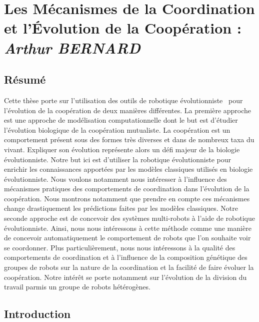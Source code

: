 \chapter*{Les Mécanismes de la Coordination et l'Évolution de la Coopération : \newline \textit{\large Arthur BERNARD}}

\setcounter{chapter}{1}

\minitoc[n] %

\setcounter{page}{1}

\section{Résumé}

	Cette thèse porte sur l'utilisation des outils de robotique évolutionniste~\parencite{Nolfi2000, Doncieux2015a} pour l'évolution de la coopération de deux manières différentes. La première approche est une approche de modélisation computationnelle dont le but est d'étudier l'évolution biologique de la coopération mutualiste. La coopération est un comportement présent sous des formes très diverses et dans de nombreux taxa du vivant. Expliquer son évolution représente alors un défi majeur de la biologie évolutionniste. Notre but ici est d'utiliser la robotique évolutionniste pour enrichir les connaissances apportées par les modèles classiques utilisés en biologie évolutionniste. Nous voulons notamment nous intéresser à l'influence des mécanismes pratiques des comportements de coordination dans l'évolution de la coopération. Nous montrons notamment que prendre en compte ces mécanismes change drastiquement les prédictions faites par les modèles classiques. Notre seconde approche est de concevoir des systèmes multi-robots à l'aide de robotique évolutionniste. Ainsi, nous nous intéressons à cette méthode comme une manière de concevoir automatiquement le comportement de robots que l'on souhaite voir se coordonner. Plus particulièrement, nous nous intéressons à la qualité des comportements de coordination et à l'influence de la composition génétique des groupes de robots sur la nature de la coordination et la facilité de faire évoluer la coopération. Notre intérêt se porte notamment sur l'évolution de la division du travail parmis un groupe de robots hétérogènes.


\section{Introduction}

